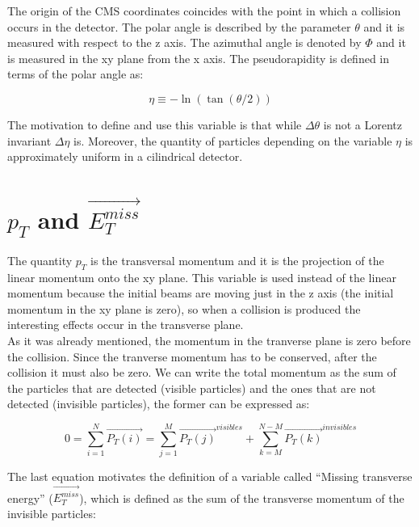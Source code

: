 The origin of the CMS coordinates coincides with the point in which a collision occurs in the detector. 
The polar angle is described by the parameter $\theta$ and it is measured with respect to the z axis.
The azimuthal angle is denoted by $\Phi$ and it is measured in the xy plane from the x axis. The pseudorapidity is defined in terms of the polar angle as:

\begin{equation}
 \eta \equiv - \ln \left( \tan (\theta /2 ) \right)
\end{equation}

 The motivation to define and use this variable is that while $\Delta \theta$ is not a Lorentz invariant $\Delta \eta$ is. Moreover, the quantity of particles depending on the variable $\eta$
 is approximately uniform in a cilindrical detector. 
 
  
 \section{$p_T$ and $\vec{E_T^{miss}}$}

 The quantity $p_T$ is the transversal momentum and it is the projection of the linear momentum onto the xy plane. This variable is used instead of the linear momentum because the initial beams
 are moving just in the z axis (the initial momentum in the xy plane is zero), so when a collision is produced the interesting effects occur in the transverse plane.\\
 
 As it was already mentioned, the momentum in the tranverse plane is zero before the collision. Since the tranverse momentum has to be conserved, after the collision it must also be zero. We can write
 the total momentum as the sum of the particles that are detected (visible particles) and the ones that are not detected (invisible particles), the former can be expressed as:
 
 \begin{equation}
  0 = \sum_{i=1}^N \vec{P_T(i)} = \sum_{j=1}^M \vec{P_T(j)}^{visibles} + \sum_{k=M}^{N-M} \vec{P_T(k)}^{invisibles}
 \end{equation}


 The last equation motivates the definition of a variable called ``Missing transverse energy'' ($\vec{E_T^{miss}}$), which is defined as the sum of the transverse momentum of the invisible
 particles:
 
